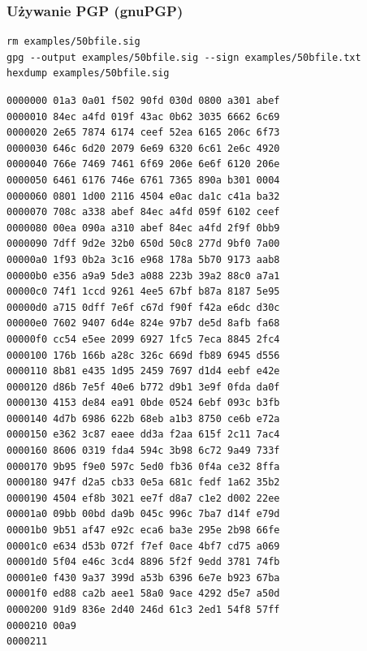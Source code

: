\documentclass[11pt]{article}
\begin{document}
\subsubsection{Używanie PGP (gnuPGP)}
\label{sec:orgb4feb77}
\begin{verbatim}
rm examples/50bfile.sig
gpg --output examples/50bfile.sig --sign examples/50bfile.txt
hexdump examples/50bfile.sig
\end{verbatim}

\begin{verbatim}
0000000 01a3 0a01 f502 90fd 030d 0800 a301 abef
0000010 84ec a4fd 019f 43ac 0b62 3035 6662 6c69
0000020 2e65 7874 6174 ceef 52ea 6165 206c 6f73
0000030 646c 6d20 2079 6e69 6320 6c61 2e6c 4920
0000040 766e 7469 7461 6f69 206e 6e6f 6120 206e
0000050 6461 6176 746e 6761 7365 890a b301 0004
0000060 0801 1d00 2116 4504 e0ac da1c c41a ba32
0000070 708c a338 abef 84ec a4fd 059f 6102 ceef
0000080 00ea 090a a310 abef 84ec a4fd 2f9f 0bb9
0000090 7dff 9d2e 32b0 650d 50c8 277d 9bf0 7a00
00000a0 1f93 0b2a 3c16 e968 178a 5b70 9173 aab8
00000b0 e356 a9a9 5de3 a088 223b 39a2 88c0 a7a1
00000c0 74f1 1ccd 9261 4ee5 67bf b87a 8187 5e95
00000d0 a715 0dff 7e6f c67d f90f f42a e6dc d30c
00000e0 7602 9407 6d4e 824e 97b7 de5d 8afb fa68
00000f0 cc54 e5ee 2099 6927 1fc5 7eca 8845 2fc4
0000100 176b 166b a28c 326c 669d fb89 6945 d556
0000110 8b81 e435 1d95 2459 7697 d1d4 eebf e42e
0000120 d86b 7e5f 40e6 b772 d9b1 3e9f 0fda da0f
0000130 4153 de84 ea91 0bde 0524 6ebf 093c b3fb
0000140 4d7b 6986 622b 68eb a1b3 8750 ce6b e72a
0000150 e362 3c87 eaee dd3a f2aa 615f 2c11 7ac4
0000160 8606 0319 fda4 594c 3b98 6c72 9a49 733f
0000170 9b95 f9e0 597c 5ed0 fb36 0f4a ce32 8ffa
0000180 947f d2a5 cb33 0e5a 681c fedf 1a62 35b2
0000190 4504 ef8b 3021 ee7f d8a7 c1e2 d002 22ee
00001a0 09bb 00bd da9b 045c 996c 7ba7 d14f e79d
00001b0 9b51 af47 e92c eca6 ba3e 295e 2b98 66fe
00001c0 e634 d53b 072f f7ef 0ace 4bf7 cd75 a069
00001d0 5f04 e46c 3cd4 8896 5f2f 9edd 3781 74fb
00001e0 f430 9a37 399d a53b 6396 6e7e b923 67ba
00001f0 ed88 ca2b aee1 58a0 9ace 4292 d5e7 a50d
0000200 91d9 836e 2d40 246d 61c3 2ed1 54f8 57ff
0000210 00a9                                   
0000211
\end{verbatim}
\end{document}

